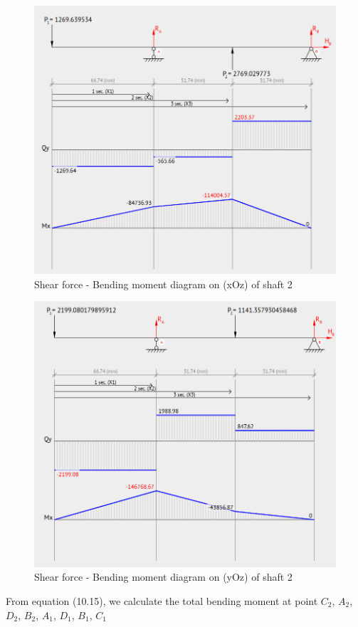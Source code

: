 \begin{figure}[ht]
	\centering
	\includegraphics[width=150mm]{shaft2_xoz.png}
	\caption{Shear force - Bending moment diagram on (xOz) of shaft 2}
	\label{2_xoz}
\end{figure}

\begin{figure}[ht]
	\centering
	\includegraphics[width=150mm]{shaft2_yoz.png}
	\caption{Shear force - Bending moment diagram on (yOz) of shaft 2}
	\label{2_yoz}
\end{figure}
From equation (10.15), we calculate the total bending moment at point $ C_2 $, $ A_2 $, $ D_2 $, $ B_2 $, $ A_1 $, $ D_1 $, $ B_1 $, $ C_1 $
